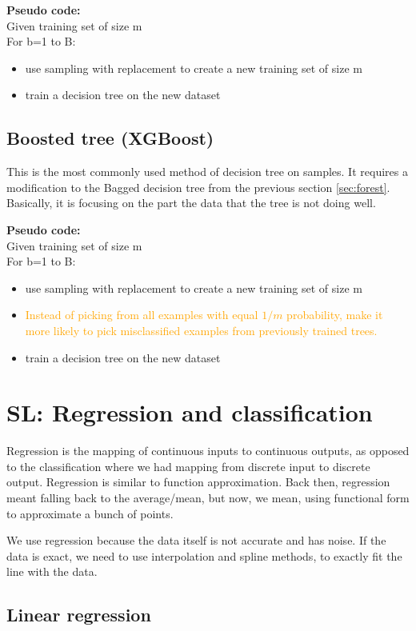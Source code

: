 \documentclass[12pt]{report}
\begin{document}
\textbf{Pseudo code:} \\
Given training set of size m \\
For b=1 to B:
\begin{itemize}
  \item use sampling with replacement to create a new training set of size m
  \item train a decision tree on the new dataset
\end{itemize}

\subsection{Boosted tree (XGBoost)}
This is the most commonly used method of decision tree on samples. It requires a modification to the Bagged decision tree from the previous section \ref{sec:forest}. Basically, it is focusing on the part the data that the tree is not doing well.

\textbf{Pseudo code:}\\
Given training set of size m\\
For b=1 to B:
\begin{itemize}
  \item use sampling with replacement to create a new training set of size m
  \item \textcolor{orange}{Instead of picking from all examples with equal $1/m$ probability, make it more likely to pick misclassified examples from previously trained trees.}
  \item train a decision tree on the new dataset
\end{itemize}


\section{SL: Regression and classification}

Regression is the mapping of continuous inputs to continuous outputs, as opposed to the classification where we had mapping from discrete input to discrete output. Regression is similar to function approximation. Back then, regression meant falling  back to the average/mean, but now, we mean, using functional form to approximate a bunch of points.

We use regression because the data itself is not accurate and has noise. If the data is exact, we need to use interpolation and spline methods, to exactly fit the line with the data.

\subsection{Linear regression}
\end{document}
